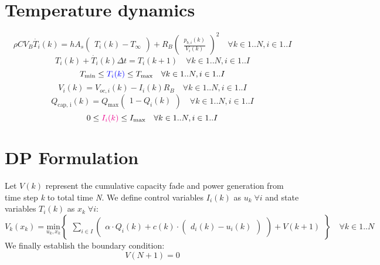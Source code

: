 \documentclass{article}
\begin{document}
\section{Temperature dynamics}
\begin{equation}\label{eq8}
	\rho CV_B\dot{T_i}(k) = hA_s\begin{pmatrix}T_i(k) - T_{\infty}\end{pmatrix} + R_B\begin{pmatrix}\frac{p_{b,i}(k)}{V_i(k)}\end{pmatrix}^2 \quad \forall k\in 1..N, i\in 1..I
\end{equation}
\begin{equation}\label{eq9}
	T_i(k)+\dot{T_i}(k)\Delta t = T_i(k+1) \quad \forall k\in 1..N, i\in 1..I
\end{equation}
\begin{equation}\label{eq10}
	T_{\text{min}} \leq \color{blue}T_i(k)\color{black} \leq T_{\text{max}} \quad \forall k\in 1..N, i\in 1..I
\end{equation}
\begin{equation}\label{eq12}
	V_i(k) = V_{oc,i}(k) -I_i(k)R_B \quad \forall k\in 1..N, i\in 1..I
\end{equation}
\begin{equation}\label{eq15}
	Q_{\text{cap, i}}(k) = Q_{\text{max}}\begin{pmatrix}1-Q_i(k)\end{pmatrix} \quad \forall k\in 1..N, i\in 1..I
\end{equation}
\begin{equation}
	0 \leq \color{magenta}I_{i}(k)\color{black} \leq I_{\text{max}} \quad \forall k\in 1..N, i\in 1..I
\end{equation}

\section{DP Formulation}
Let $V(k)$ represent the cumulative capacity fade and power generation from time step \textit{k} to total time \textit{N}. We define control variables $I_i(k)$ as $u_k \; \forall i$ and state variables $T_i(k)$ as $x_k \; \forall i$:
\begin{equation}\label{eq16}
	V_k(x_k) = \underset{u_k,x_k}{\text{min}}\begin{Bmatrix}\sum_{i\in I}\begin{pmatrix}\alpha \cdot Q_i(k) + c(k)\cdot\begin{pmatrix}d_i(k)-u_i(k)\end{pmatrix}\end{pmatrix} + V(k+1) \end{Bmatrix}\quad \forall k\in 1..N
\end{equation}
We finally establish the boundary condition: \[V(N+1) = 0\]
\end{document}
